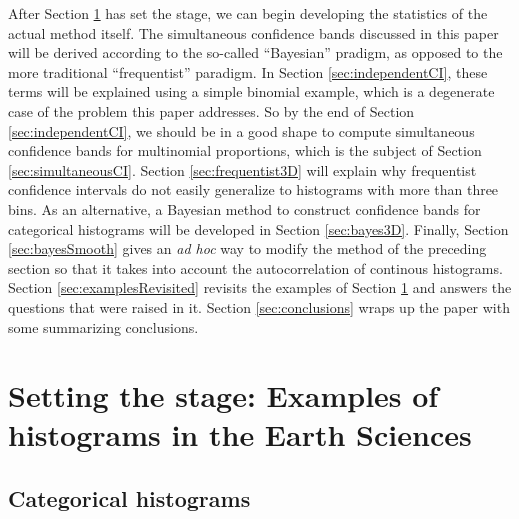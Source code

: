 \documentclass{article}
\begin{document}
After Section  \ref{sec:setTheStage} has set  the stage, we  can begin
developing  the   statistics  of   the  actual  method   itself.   The
simultaneous confidence bands discussed  in this paper will be derived
according  to the so-called  ``Bayesian'' pradigm,  as opposed  to the
more    traditional     ``frequentist''    paradigm.     In    Section
\ref{sec:independentCI}, these terms will  be explained using a simple
binomial example, which is a degenerate case of the problem this paper
addresses. So by the end of Section \ref{sec:independentCI}, we should
be  in a  good  shape  to compute  simultaneous  confidence bands  for
multinomial   proportions,   which   is   the   subject   of   Section
\ref{sec:simultaneousCI}. Section \ref{sec:frequentist3D} will explain
why  frequentist  confidence intervals  do  not  easily generalize  to
histograms with  more than three  bins. As an alternative,  a Bayesian
method to  construct confidence bands for  categorical histograms will
be   developed  in   Section   \ref{sec:bayes3D}.   Finally,   Section
\ref{sec:bayesSmooth} gives an  {\it ad hoc} way to  modify the method
of  the  preceding   section  so  that  it  takes   into  account  the
autocorrelation      of       continous      histograms.       Section
\ref{sec:examplesRevisited}   revisits   the   examples   of   Section
\ref{sec:setTheStage} and  answers the  questions that were  raised in
it.   Section  \ref{sec:conclusions}  wraps  up the  paper  with  some
summarizing conclusions.

\section{Setting the stage: Examples of histograms in the Earth Sciences} 
\label{sec:setTheStage}
\subsection{Categorical histograms} \label{sec:categorical}
\end{document}
